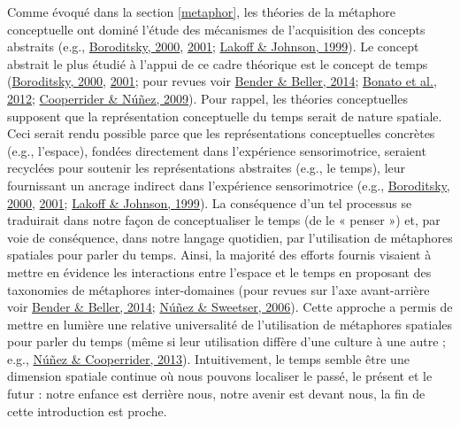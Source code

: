 \documentclass[
  a4paper,12pt,twoside,onecolumn,openright,final,oldfontcommands]{memoir}
\begin{document}
Comme évoqué dans la section \ref{metaphor}, les théories de la métaphore conceptuelle ont dominé l'étude des mécanismes de l'acquisition des concepts abstraits (e.g., \protect\hyperlink{ref-boroditsky_metaphoric_2000}{Boroditsky, 2000}, \protect\hyperlink{ref-boroditsky_does_2001}{2001}; \protect\hyperlink{ref-lakoff_philosophy_1999}{Lakoff \& Johnson, 1999}). Le concept abstrait le plus étudié à l'appui de ce cadre théorique est le concept de temps (\protect\hyperlink{ref-boroditsky_metaphoric_2000}{Boroditsky, 2000}, \protect\hyperlink{ref-boroditsky_does_2001}{2001}; pour revues voir \protect\hyperlink{ref-bender_mapping_2014}{Bender \& Beller, 2014}; \protect\hyperlink{ref-bonato_when_2012}{Bonato et al., 2012}; \protect\hyperlink{ref-cooperrider_across_2009}{Cooperrider \& Núñez, 2009}). Pour rappel, les théories conceptuelles supposent que la représentation conceptuelle du temps serait de nature spatiale. Ceci serait rendu possible parce que les représentations conceptuelles concrètes (e.g., l'espace), fondées directement dans l'expérience sensorimotrice, seraient recyclées pour soutenir les représentations abstraites (e.g., le temps), leur fournissant un ancrage indirect dans l'expérience sensorimotrice (e.g., \protect\hyperlink{ref-boroditsky_metaphoric_2000}{Boroditsky, 2000}, \protect\hyperlink{ref-boroditsky_does_2001}{2001}; \protect\hyperlink{ref-lakoff_philosophy_1999}{Lakoff \& Johnson, 1999}). La conséquence d'un tel processus se traduirait dans notre façon de conceptualiser le temps (de le « penser ») et, par voie de conséquence, dans notre langage quotidien, par l'utilisation de métaphores spatiales pour parler du temps. Ainsi, la majorité des efforts fournis visaient à mettre en évidence les interactions entre l'espace et le temps en proposant des taxonomies de métaphores inter-domaines (pour revues sur l'axe avant-arrière voir \protect\hyperlink{ref-bender_mapping_2014}{Bender \& Beller, 2014}; \protect\hyperlink{ref-nunez_future_2006}{Núñez \& Sweetser, 2006}). Cette approche a permis de mettre en lumière une relative universalité de l'utilisation de métaphores spatiales pour parler du temps (même si leur utilisation diffère d'une culture à une autre ; e.g., \protect\hyperlink{ref-nunez_tangle_2013}{Núñez \& Cooperrider, 2013}). Intuitivement, le temps semble être une dimension spatiale continue où nous pouvons localiser le passé, le présent et le futur : notre enfance est derrière nous, notre avenir est devant nous, la fin de cette introduction est proche.
\end{document}

